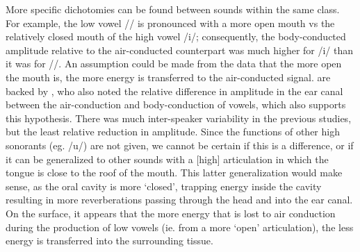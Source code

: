 More specific dichotomies can be found between sounds within the same class. For example, the low vowel /\DIFdelbegin {}\DIFdelend \DIFaddbegin {}\DIFaddend / is pronounced with a more open mouth vs the relatively closed mouth of the high vowel /i/; consequently, the body-conducted amplitude relative to the air-conducted counterpart was much higher for /i/ than it was for /\DIFdelbegin {}\DIFdelend \DIFaddbegin {}\DIFaddend /. An assumption could be made from the data that the more open the mouth is, the more energy is transferred to the air-conducted signal.%
\DIFdelbegin {}\DIFdelend \DIFaddbegin {}\DIFaddend are backed by \cite{bekesy:60}, who also noted %
the relative difference in amplitude in the ear canal between the air-conduction and body-conduction of vowels, %
which also supports this hypothesis.  There was much inter-speaker variability in the previous studies, but \DIFdelbegin {}\DIFdelend \DIFaddbegin {}\DIFaddend the least relative reduction in amplitude\DIFdelbegin {}\DIFdelend .  Since the functions of other high sonorants (eg. /u/) are not given, we cannot be certain if this is a \DIFdelbegin {}\DIFdelend \DIFaddbegin {}\DIFaddend difference, or if it can be generalized to other sounds with a [high] articulation in which the tongue is close to the roof of the mouth.  This latter generalization would make sense, as the oral cavity is more `closed', trapping energy inside the cavity resulting in more reverberations passing through the head and into the ear canal.
%
%
On the surface, it appears that the more energy that is lost to air conduction during the production of low vowels (ie. from a more `open' articulation), the less energy is transferred into the surrounding tissue.

